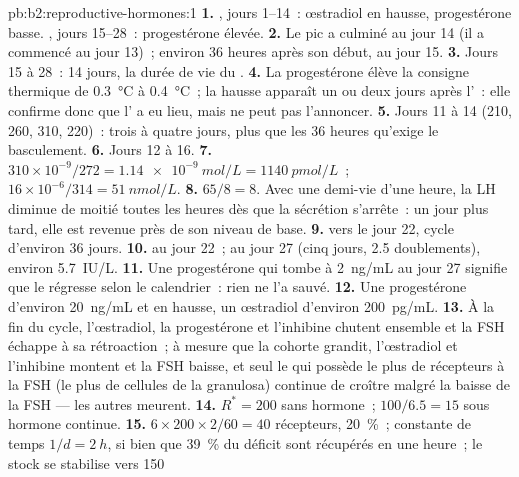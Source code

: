 \begin{solution}{pb:b2:reproductive-hormones:1}
\textbf{1.} , jours 1--14~: œstradiol en hausse,
progestérone basse. , jours 15--28~: progestérone élevée.
\textbf{2.} Le pic a culminé au jour 14 (il a commencé au jour 13)~;
 environ 36 heures après son début, au jour 15.
\textbf{3.} Jours 15 à 28~: 14 jours, la durée de vie du .
\textbf{4.} La progestérone élève la consigne thermique de
\qty{0.3}{\celsius} à \qty{0.4}{\celsius}~; la hausse apparaît un ou
deux jours après l'~: elle confirme donc que l' a eu
lieu, mais ne peut pas l'annoncer.
\textbf{5.} Jours 11 à 14 (210, 260, 310, 220)~: trois à quatre jours,
plus que les 36 heures qu'exige le basculement.
\textbf{6.} Jours 12 à 16.
\textbf{7.} $310\times 10^{-9}/272 = \qty{1.14e-9}{mol/L} =
\qty{1140}{pmol/L}$~; $16\times 10^{-6}/314 = \qty{51}{nmol/L}$.
\textbf{8.} $65/8 = 8$. Avec une demi-vie d'une heure, la LH diminue de
moitié toutes les heures dès que la sécrétion s'arrête~: un jour plus
tard, elle est revenue près de son niveau de base.
\textbf{9.}  vers le jour 22, cycle d'environ 36 jours.
\textbf{10.}  au jour 22~; au jour 27 (cinq jours, 2.5
doublements), environ \qty{5.7}{IU/L}.
\textbf{11.} Une progestérone qui tombe à \qty{2}{ng/mL} au jour 27
signifie que le  régresse selon le calendrier~: rien ne l'a
sauvé.
\textbf{12.} Une progestérone d'environ \qty{20}{ng/mL} et en hausse,
un œstradiol d'environ \qty{200}{pg/mL}.
\textbf{13.} À la fin du cycle, l'œstradiol, la progestérone et
l'inhibine chutent ensemble et la FSH échappe à sa rétroaction~; à
mesure que la cohorte grandit, l'œstradiol et l'inhibine montent et la
FSH baisse, et seul le  qui possède le plus de récepteurs à la
FSH (le plus de cellules de la granulosa) continue de croître malgré la
baisse de la FSH --- les autres meurent.
\textbf{14.} $R^* = 200$ sans hormone~; $100/6.5 = 15$ sous hormone
continue.
\textbf{15.} $6\times 200\times 2/60 = 40$ récepteurs, \qty{20}{\%}~;
constante de temps $1/d = \qty{2}{h}$, si bien que \qty{39}{\%} du
déficit sont récupérés en une heure~; le stock se stabilise vers 150

\end{solution}

